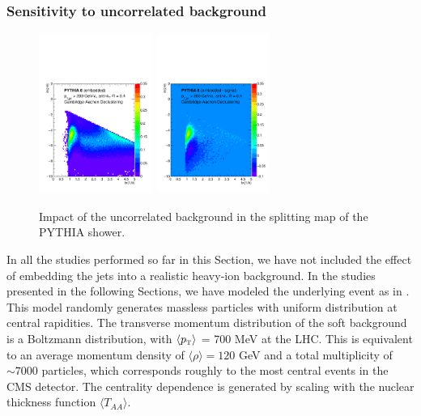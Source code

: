 \subsubsection{Sensitivity to uncorrelated background}
\label{sec:uncorrelatedbackground}

\begin{figure}[th]
\centering
\includegraphics[width=0.33\textwidth]
{figures/LundMC/FinalPlots/PythiaEmb_CA.pdf}%
\includegraphics[width=0.33\textwidth]
{figures/LundMC/FinalPlots/PythiaDiff_CA.pdf}%
\caption{Impact of the uncorrelated background in the splitting map of the PYTHIA shower.}
\label{fig:UncorrelatedBkg}
\end{figure}

In all the studies performed so far in this Section, we have not included the effect of embedding the jets into a realistic heavy-ion background. In the studies presented in the following Sections, we have modeled the underlying event as in \cite{deBarros:2012ws}. 
This model randomly generates massless particles with uniform distribution at central rapidities. The transverse momentum distribution of the soft background is a Boltzmann distribution, with $\langle p_{\text{\tiny T}} \rangle$ = 700 MeV at the LHC. This is equivalent to an average momentum density of $\langle \rho \rangle =120$ GeV and a total multiplicity of $\sim 7000$ particles, which corresponds roughly to the most central events in the CMS detector. The centrality dependence is generated by scaling with the nuclear thickness function $\langle T_{AA} \rangle$.

